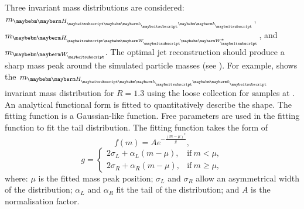 Three invariant mass distributions are considered:  $m_{\Hbb}$, $m_{\HWW}$, and $m_{\PW}$. The optimal jet reconstruction should produce a sharp mass peak around the simulated particle masses (see ). For example,  shows the $m_{\Hbb}$ invariant mass distribution for $R = 1.3$ using the loose \PFO collection for samples at . An analytical functional form is fitted to quantitatively describe the shape. The fitting function is a Gaussian-like function. Free parameters are used in the fitting function to fit the tail distribution. The fitting function takes the form of
\begin{equation}
f(m)=A e^{- \frac{(m - \mu)^2}{g}},
\end{equation}
\begin{equation}
g=
\begin{cases}
2\sigma_L + \alpha_L(m - \mu), & \text{if}\ m < \mu,\\
2\sigma_R + \alpha_R(m - \mu), & \text{if}\ m \geqslant \mu,
\end{cases}
\end{equation}
where: $\mu$ is the fitted mass peak position; $\sigma_L$ and $\sigma_R$ allow an asymmetrical width of the distribution; $\alpha_L$ and  $\alpha_R$  fit the tail of the distribution; and $A$ is the normalisation factor.


